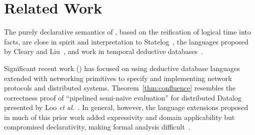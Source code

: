 \section{Related Work}
\label{sec:relwork}

The purely declarative semantics of \lang, based on the reification of logical time into
facts, are close in spirit and interpretation to Statelog~\cite{statelog},
the languages proposed by Cleary and Liu~\cite{harmful,deductiveupdates,starlog}, and work in 
temporal deductive databases~\cite{tdd-infinite}.%

Significant recent work (\cite{boom,Belaramani:2009,Chu:2007,Loo2009-CACM}) has focused on using deductive database languages extended with networking 
primitives to specify and implementing network protocols and distributed systems.  Theorem~\ref{thm:confluence} resembles the correctness proof of ``pipelined
semi-naive evaluation'' for distributed Datalog presented by Loo \emph{et al}.~\cite{loo-sigmod06}.
In general, however, the language extensions 
proposed in much of this prior work added
expressivity and domain applicability but compromised declarativity,
making formal analysis difficult~\cite{Mao2009,navarro-oper-sem}.


